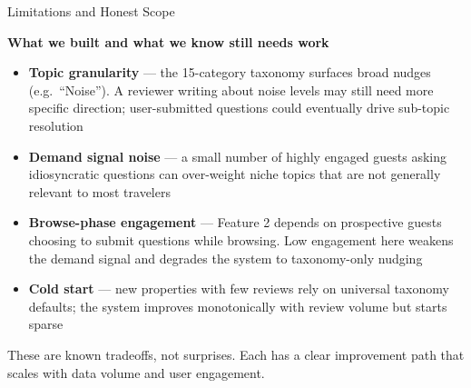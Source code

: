 \documentclass[aspectratio=169,10pt]{beamer}
\newcommand{\shead}[1]{\smallskip\textbf{#1}\par\smallskip}
\begin{document}
\begin{frame}{Limitations and Honest Scope}

\shead{What we built and what we know still needs work}

\begin{itemize}
  \item \textbf{Topic granularity} --- the 15-category taxonomy surfaces broad nudges (e.g.\ ``Noise'').
        A reviewer writing about noise levels may still need more specific direction;
        user-submitted questions could eventually drive sub-topic resolution

  \item \textbf{Demand signal noise} --- a small number of highly engaged guests asking idiosyncratic
        questions can over-weight niche topics that are not generally relevant to most travelers

  \item \textbf{Browse-phase engagement} --- Feature 2 depends on prospective guests choosing to
        submit questions while browsing. Low engagement here weakens the demand signal and
        degrades the system to taxonomy-only nudging

  \item \textbf{Cold start} --- new properties with few reviews rely on universal taxonomy defaults;
        the system improves monotonically with review volume but starts sparse
\end{itemize}

\medskip
These are known tradeoffs, not surprises. Each has a clear improvement path
that scales with data volume and user engagement.

\end{frame}
\end{document}
